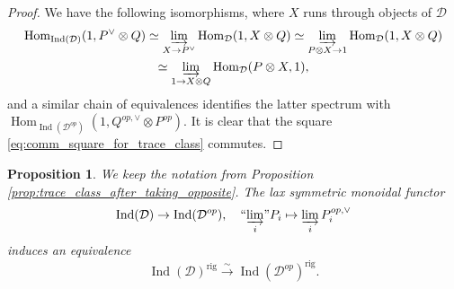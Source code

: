 \documentclass[11pt,leqno]{amsart}
\newtheorem{prop}[theo]{Proposition}
\numberwithin{equation}{section}
\def\Hom{\operatorname{Hom}}
\newcommand{\indlim}[1][]{\mathop{\varinjlim}\limits_{#1}}
\newcommand{\inddlim}[1][]{{``{\indlim[#1]}"}}
\newcommand{\xto}{\xrightarrow}
\newcommand{\rig}{\operatorname{rig}}
\newcommand{\Cat}{\operatorname{Cat}}
\newcommand{\st}{\operatorname{st}}
\newcommand{\dual}{\operatorname{dual}}
\newcommand{\bE}{{\mathbb E}}
\newcommand{\cD}{{\mathcal D}}
\newcommand{\cC}{{\mathcal C}}
\newcommand{\Sp}{\operatorname{Sp}}
\newcommand{\Ind}{\operatorname{Ind}}
\newcommand{\mult}{\operatorname{mult}}
\begin{document}
\begin{proof}
	We have the following isomorphisms, where $X$ runs through objects of $\cD$
	\begin{multline*}
		\Hom_{\Ind(\cD)}(1,P^{\vee}\otimes Q)\simeq \indlim[X\to P^{\vee}]\Hom_{\cD}(1,X\otimes Q)\simeq \indlim[P\otimes X\to 1]\Hom_{\cD}(1,X\otimes Q)\\
		\simeq \indlim[1\to X\otimes Q]\Hom_{\cD}(P\otimes X,1),
	\end{multline*}
	and a similar chain of equivalences identifies the latter spectrum with $\Hom_{\Ind(\cD^{op})}(1,Q^{op,\vee}\otimes P^{op}).$ It is clear that the square \eqref{eq:comm_square_for_trace_class} commutes.
\end{proof}

\begin{prop}\label{prop:from_Ind_D_to_Ind_D^op}
We keep the notation from Proposition \ref{prop:trace_class_after_taking_opposite}. The lax symmetric monoidal functor 
\begin{equation}\label{eq:explicit_functor_Ind_D_Ind_D^op}
\Ind(\cD)\to \Ind(\cD^{op}),\quad \inddlim[i] P_i\mapsto \indlim[i] P_i^{op,\vee}	
\end{equation}
induces an equivalence
\begin{equation*}
\Ind(\cD)^{\rig}\xto{\sim} \Ind(\cD^{op})^{\rig}.
\end{equation*}	
\end{prop}
\end{document}
